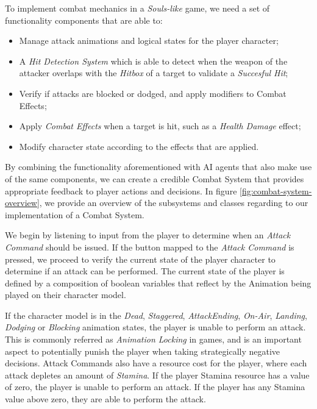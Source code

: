 To implement combat mechanics in a \emph{Souls-like} game, we need a set of functionality components that are able to:
\begin{itemize}
    \item{Manage attack animations and logical states for the player character;}
    \item{A \emph{Hit Detection System} which is able to detect when the weapon of the attacker overlaps with the \emph{Hitbox} of a target to validate a \emph{Succesful Hit};}
    \item{Verify if attacks are blocked or dodged, and apply modifiers to Combat Effects;}
    \item{Apply \emph{Combat Effects} when a target is hit, such as a \emph{Health Damage} effect;}
    \item{Modify character state according to the effects that are applied.}
\end{itemize}
By combining the functionality aforementioned with AI agents that also make use of the same components, we can create a credible Combat System that provides appropriate feedback to player actions and decisions. In figure \ref{fig:combat-system-overview}, we provide an overview of the subsystems and classes regarding to our implementation of a Combat System.



We begin by listening to input from the player to determine when an \emph{Attack Command} should be issued. If the button mapped to the \emph{Attack Command} is pressed, we proceed to verify the current state of the player character to determine if an attack can be performed. The current state of the player is defined by a composition of boolean variables that reflect by the Animation being played on their character model.

If the character model is in the \emph{Dead}, \emph{Staggered}, \emph{AttackEnding}, \emph{On-Air}, \emph{Landing}, \emph{Dodging} or \emph{Blocking} animation states, the player is unable to perform an attack. This is commonly referred as \emph{Animation Locking} in games, and is an important aspect to potentially punish the player when taking strategically negative decisions. Attack Commands also have a resource cost for the player, where each attack depletes an amount of \emph{Stamina}. If the player Stamina resource has a value of zero, the player is unable to perform an attack. If the player has any Stamina value above zero, they are able to perform the attack.

